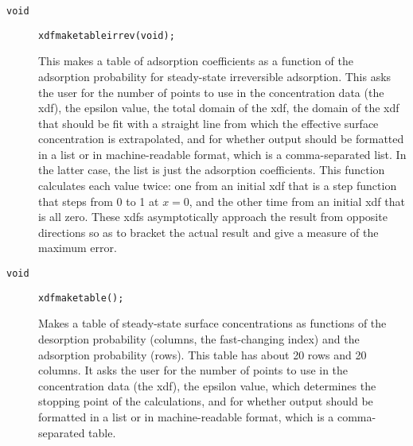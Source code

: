 \documentclass[11pt]{article}
\newcommand {\ttt} {\texttt}
\begin{document}
\begin{description}
\item[\ttt{void}] 
\ttt{xdfmaketableirrev(void);}

This makes a table of adsorption coefficients as a function of the adsorption probability for steady-state irreversible adsorption. This asks the user for the number of points to use in the concentration data (the xdf), the epsilon value, the total domain of the xdf, the domain of the xdf that should be fit with a straight line from which the effective surface concentration is extrapolated, and for whether output should be formatted in a list or in machine-readable format, which is a comma-separated list. In the latter case, the list is just the adsorption coefficients. This function calculates each value twice: one from an initial xdf that is a step function that steps from 0 to 1 at $x = 0$, and the other time from an initial xdf that is all zero. These xdfs asymptotically approach the result from opposite directions so as to bracket the actual result and give a measure of the maximum error.

\item[\ttt{void}] 
\ttt{xdfmaketable();}

Makes a table of steady-state surface concentrations as functions of the desorption probability (columns, the fast-changing index) and the adsorption probability (rows). This table has about 20 rows and 20 columns. It asks the user for the number of points to use in the concentration data (the xdf), the epsilon value, which determines the stopping point of the calculations, and for whether output should be formatted in a list or in machine-readable format, which is a comma-separated table.


\end{description}



\end{document}
